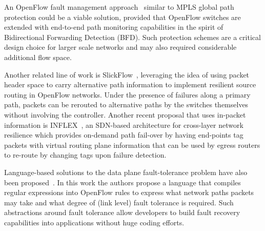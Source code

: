 An OpenFlow fault management approach~\cite{kempf2012} similar to MPLS global path protection could be a viable solution, provided that OpenFlow switches are extended with end-to-end path monitoring capabilities in the spirit of Bidirectional Forwarding Detection (BFD). Such protection schemes are a critical design choice for larger scale networks and may also required considerable additional flow space. 

Another related line of work is SlickFlow~\cite{ramos2013}, leveraging the idea of using packet header space to carry alternative path information to implement resilient source routing in OpenFlow networks. Under the presence of failures along a primary path, packets can be rerouted to alternative paths by the switches themselves without involving the controller. 
Another recent proposal that uses in-packet information is INFLEX~\cite{araujosoftware}, an SDN-based architecture
for cross-layer network resilience which provides on-demand path fail-over by having end-points tag packets with virtual routing plane information that can be used by egress routers to re-route by changing tags upon failure detection.

Language-based solutions to the data plane fault-tolerance problem have also been proposed~\cite{reitblatt2013}. In this work the authors propose a language that compiles regular expressions into OpenFlow rules to express what network paths packets may take and what degree of (link level) fault tolerance is required. Such abstractions around fault tolerance allow developers to build fault recovery capabilities into applications without huge coding efforts.


